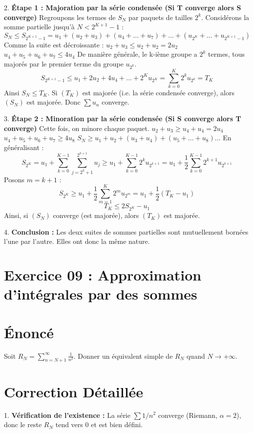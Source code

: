 \documentclass[12pt, a4paper]{article}
\begin{document}
2. \textbf{Étape 1 : Majoration par la série condensée (Si T converge alors S converge)}
   Regroupons les termes de $S_N$ par paquets de tailles $2^k$.
   Considérons la somme partielle jusqu'à $N < 2^{K+1}-1$ :
   $$S_N \le S_{2^{K+1}-1} = u_1 + (u_2 + u_3) + (u_4 + \dots + u_7) + \dots + (u_{2^K} + \dots + u_{2^{K+1}-1})$$
   Comme la suite est décroissante :
   $u_2 + u_3 \le u_2 + u_2 = 2u_2$
   $u_4 + u_5 + u_6 + u_7 \le 4u_4$
   De manière générale, le k-ième groupe a $2^k$ termes, tous majorés par le premier terme du groupe $u_{2^k}$.
   $$S_{2^{K+1}-1} \le u_1 + 2u_2 + 4u_4 + \dots + 2^K u_{2^K} = \sum_{k=0}^K 2^k u_{2^k} = T_K$$
   Ainsi $S_N \le T_K$. Si $(T_K)$ est majorée (i.e. la série condensée converge), alors $(S_N)$ est majorée. Donc $\sum u_n$ converge.

3. \textbf{Étape 2 : Minoration par la série condensée (Si S converge alors T converge)}
   Cette fois, on minore chaque paquet.
   $u_2 + u_3 \ge u_4 + u_4 = 2u_4$
   $u_4 + u_5 + u_6 + u_7 \ge 4u_8$
   $S_N \ge u_1 + u_2 + (u_3 + u_4) + (u_5 + \dots + u_8) \dots$
   En généralisant :
   $$S_{2^K} = u_1 + \sum_{k=0}^{K-1} \sum_{j=2^k+1}^{2^{k+1}} u_j \ge u_1 + \sum_{k=0}^{K-1} 2^k u_{2^{k+1}} = u_1 + \frac{1}{2} \sum_{k=0}^{K-1} 2^{k+1} u_{2^{k+1}}$$
   Posons $m = k+1$ :
   $$S_{2^K} \ge u_1 + \frac{1}{2} \sum_{m=1}^{K} 2^m u_{2^m} = u_1 + \frac{1}{2} (T_K - u_1)$$
   $$T_K \le 2S_{2^K} - u_1$$
   Ainsi, si $(S_N)$ converge (est majorée), alors $(T_K)$ est majorée.

4. \textbf{Conclusion :}
   Les deux suites de sommes partielles sont mutuellement bornées l'une par l'autre. Elles ont donc la même nature.


\section*{Exercice 09 : Approximation d'intégrales par des sommes}

\section{Énoncé}
Soit $R_N = \sum_{n=N+1}^\infty \frac{1}{n^2}$.
Donner un équivalent simple de $R_N$ quand $N \to +\infty$.

\section{Correction Détaillée}
1. \textbf{Vérification de l'existence :}
   La série $\sum 1/n^2$ converge (Riemann, $\alpha=2$), donc le reste $R_N$ tend vers $0$ et est bien défini.
\end{document}
